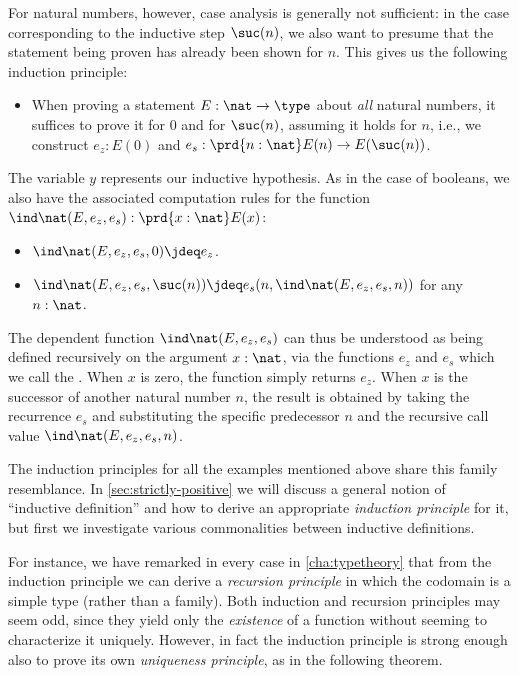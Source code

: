 %
For natural numbers, however, case analysis is generally not sufficient: in the case corresponding to the inductive step $\suc(n)$, we also want to presume that the statement being proven has already been shown for $n$.
This gives us the following induction principle:
\begin{itemize}
\item When proving a statement $E : \nat \to \type$ about \emph{all} natural numbers, it suffices to prove it for $0$ and for $\suc(n)$, assuming it holds
for $n$, i.e., we construct $e_z : E(0)$ and $e_s : \prd{n : \nat} E(n) \to E(\suc(n))$.
\end{itemize}
The variable
%
$y$ represents our inductive hypothesis.  As in the case of booleans, we also have the associated computation rules for the function $\ind\nat(E,e_z,e_s) : \prd{x:\nat} E(x)$:
%
\begin{itemize}
\item $\ind\nat(E,e_z,e_s,0) \jdeq e_z$.
\item $\ind\nat(E,e_z,e_s,\suc(n)) \jdeq e_s(n,\ind\nat(E,e_z,e_s,n))$ for any $n : \nat$.
\end{itemize}
The dependent function $\ind\nat(E,e_z,e_s)$ can thus be understood as being defined recursively on the argument $x : \nat$, via the functions $e_z$ and $e_s$ which we call the .
When $x$ is zero, the function simply returns $e_z$.
When $x$ is the successor of another natural number $n$, the result is obtained by taking the recurrence $e_s$ and substituting the specific predecessor $n$ and the recursive call value $\ind\nat(E,e_z,e_s,n)$.

The induction principles for all the examples mentioned above share this family resemblance.
In \autoref{sec:strictly-positive} we will discuss a general notion of ``inductive definition'' and how to derive an appropriate \emph{induction principle} for it, but first we investigate various commonalities between inductive definitions.

%
For instance, we have remarked in every case in \autoref{cha:typetheory} that from the induction principle we can derive a \emph{recursion principle} in which the codomain is a simple type (rather than a family).
Both induction and recursion principles may seem odd, since they yield only the \emph{existence} of a function without seeming to characterize it uniquely.
However, in fact the induction principle is strong enough also to prove its own \emph{uniqueness principle}, as in the following theorem.

